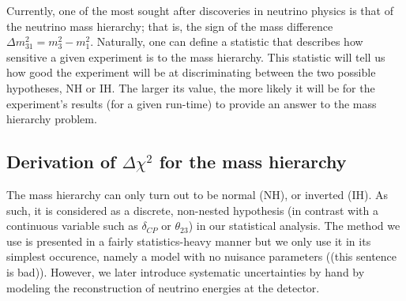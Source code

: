 Currently, one of the most sought after discoveries in neutrino physics is that of the neutrino
mass hierarchy; that is, the sign of the mass difference $\Delta m^2_{31} =
m^2_3 - m^2_1$. Naturally, one can define a statistic that describes how
sensitive a given experiment is to the mass hierarchy. This
statistic will tell us how good the experiment will be at discriminating
between the two possible hypotheses, NH or IH. The larger its value, the more
likely it will be for the experiment's results (for a given run-time) to
provide an answer to the mass hierarchy problem.


\subsection{Derivation of $\Delta \chi^2$ for the mass hierarchy}
The mass hierarchy can only turn out to be normal (NH), or inverted (IH). As
such, it is considered as a discrete, non-nested hypothesis (in contrast with a continuous
variable such as $\delta_{CP}$ or $\theta_{23}$) in our statistical analysis.
The method we use\cite{ciuffoli, qian} is presented in a fairly
statistics-heavy manner but we only use it in its simplest occurence,
namely a model with no nuisance parameters ((this sentence is bad)). However,
we later introduce systematic uncertainties by hand by modeling the
reconstruction of neutrino energies at the detector.

